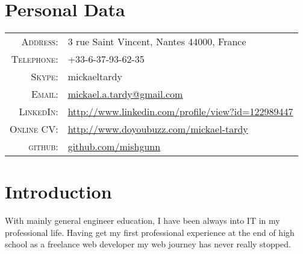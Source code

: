 \documentclass[letter,10pt]{article} %
\begin{document}
\pagestyle{empty} %



\par{\par} %
\par{\bigskip\par} %

\section{Personal Data}

\begin{tabular}{rl}
\textsc{Address:} & 3 rue Saint Vincent, Nantes  44000, France \\
\textsc{Telephone:} & +33-6-37-93-62-35\\
\textsc{Skype:} & mickaeltardy\\
\textsc{Email:} &
\href{mailto:mickael.a.tardy@gmail.com}{mickael.a.tardy@gmail.com} \\
\textsc{LinkedIn:} &
\href{http://www.linkedin.com/profile/view?id=122989447}{http://www.linkedin.com/profile/view?id=122989447}
\\
\textsc{Online CV:} &
\href{http://www.doyoubuzz.com/mickael-tardy}{http://www.doyoubuzz.com/mickael-tardy}
\\ 
\textsc{github:} & \href{https://github.com/mishgunn}{github.com/mishgunn}
\end{tabular}


\section{Introduction}

With mainly general engineer education, I have been always into IT in
my professional life. Having get my first professional experience at the end of
high school as a freelance web developer my web journey has never really
stopped.
\end{document}
